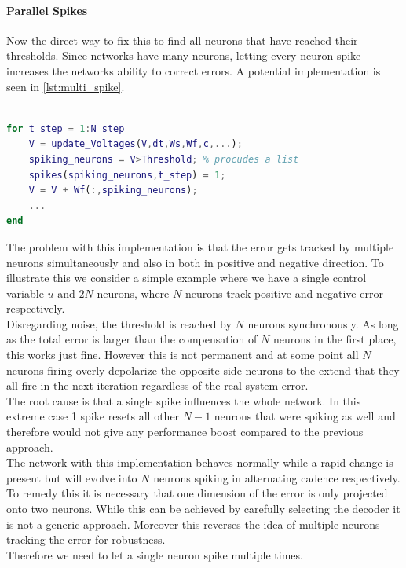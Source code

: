\paragraph{Parallel Spikes}
Now the direct way to fix this to find all neurons that have reached their thresholds. Since networks have many neurons, letting every neuron spike increases the networks ability to correct errors. A potential implementation is seen in \cref{lst:multi_spike}.
\begin{lstlisting}[language=Matlab, caption=Letting every neuron spike in parallel,label=lst:multi_spike]

for t_step = 1:N_step
	V = update_Voltages(V,dt,Ws,Wf,c,...);
	spiking_neurons = V>Threshold; % procudes a list
	spikes(spiking_neurons,t_step) = 1;
	V = V + Wf(:,spiking_neurons);
	...
end
\end{lstlisting}
The problem with this implementation is that the error gets tracked by multiple neurons simultaneously and also in both in positive and negative direction. To illustrate this we consider a simple example where we have a single control variable $u$ and $2N$ neurons, where $N$ neurons track positive and negative error respectively.\\
Disregarding noise, the threshold is reached by $N$ neurons synchronously. As long as the total error is larger than the compensation of $N$ neurons in the first place, this works just fine. However this is not permanent and at some point all $N$ neurons firing overly depolarize the opposite side neurons to the extend that they all fire in the next iteration regardless of the real system error.\\
The root cause is that a single spike influences the whole network. In this extreme case 1 spike resets all other $N-1$ neurons that were spiking as well and therefore would not give any performance boost compared to the previous approach.\\
The network with this implementation behaves normally while a rapid change is present but will evolve into $N$ neurons spiking in alternating cadence respectively.\\
To remedy this it is necessary that one dimension of the error is only projected onto two neurons. While this can be achieved by carefully selecting the decoder it is not a generic approach. Moreover this reverses the idea of multiple neurons tracking the error for robustness.\\
Therefore we need to let a single neuron spike multiple times.

